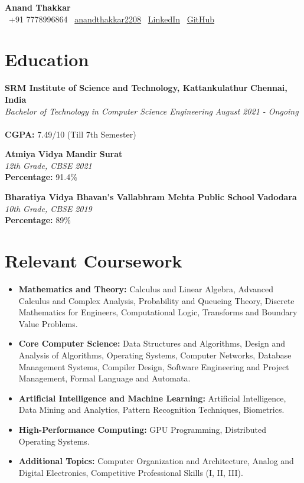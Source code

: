 \documentclass[10pt, letterpaper]{article}
\begin{document}
\begin{center}
    {\LARGE \textbf{Anand Thakkar}}\\
    \faPhone\ +91 7778996864 \quad
    \faEnvelope\ \href{mailto:anandthakkar2208}{anandthakkar2208} \quad
    \faLinkedin\ \href{https://www.linkedin.com/in/anandthakkar-8a54s/}{LinkedIn} \quad
    \faGithub\ \href{https://github.com/astroanand-6e}{GitHub}
\end{center}

\section{Education}
\textbf{SRM Institute of Science and Technology, Kattankulathur}  \hfill \textbf{Chennai, India} \\
\textit{Bachelor of Technology in Computer Science Engineering} \hfill \textit{August 2021 - Ongoing} \\\\
\textbf{CGPA:} 7.49/10 (Till 7th Semester)

\textbf{Atmiya Vidya Mandir} \hfill \textbf{Surat} \\
\textit{12th Grade, CBSE} \hfill \textit{2021}\\
\textbf{Percentage:} 91.4\%

\textbf{Bharatiya Vidya Bhavan's Vallabhram Mehta Public School} \hfill \textbf{Vadodara} \\
\textit{10th Grade, CBSE} \hfill \textit{2019} \\
\textbf{Percentage:} 89\%

\section{Relevant Coursework}
\begin{itemize}[noitemsep]
    \item \textbf{Mathematics and Theory:} Calculus and Linear Algebra, Advanced Calculus and Complex Analysis, Probability and Queueing Theory, Discrete Mathematics for Engineers, Computational Logic, Transforms and Boundary Value Problems.
    \item \textbf{Core Computer Science:} Data Structures and Algorithms, Design and Analysis of Algorithms, Operating Systems, Computer Networks, Database Management Systems, Compiler Design, Software Engineering and Project Management, Formal Language and Automata.
    \item \textbf{Artificial Intelligence and Machine Learning:} Artificial Intelligence, Data Mining and Analytics, Pattern Recognition Techniques, Biometrics.
    \item \textbf{High-Performance Computing:} GPU Programming, Distributed Operating Systems.
    \item \textbf{Additional Topics:} Computer Organization and Architecture, Analog and Digital Electronics, Competitive Professional Skills (I, II, III).
\end{itemize}
\end{document}
